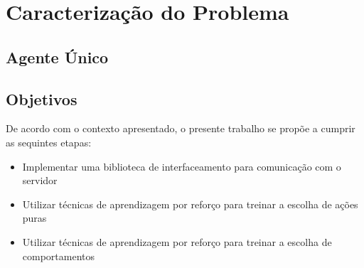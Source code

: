 \section{Caracterização do Problema}

\subsection{Agente Único}


\subsection{Objetivos}
\par De acordo com o contexto apresentado, o presente trabalho se propõe a cumprir as sequintes etapas:
\begin{itemize}
	\item Implementar uma biblioteca de interfaceamento para comunicação com o servidor
	\item Utilizar técnicas de aprendizagem por reforço para treinar a escolha de ações puras
	\item Utilizar técnicas de aprendizagem por reforço para treinar a escolha de comportamentos
\end{itemize}

